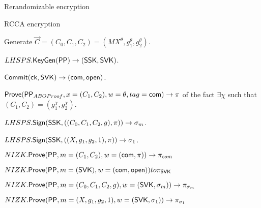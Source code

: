 \begin{frame}{Rerandomizable encryption}



      \tiny
      RCCA encryption 
      \begin{itemize}
      \item Generate $\vec{C} = (C_0, C_1, C_2) = (MX^{\theta}, g_1^{\theta},  g_2^{\theta})$.
      \item $LHSPS.{\mathsf{KeyGen}}(\mathsf{PP}) \to (\mathsf{SSK}, \mathsf{SVK})$.
      \item ${\mathsf{Commit}}(\mathsf{ck}, \mathsf{SVK}) \to (\mathsf{com}, \mathsf{open})$.
      \item ${\mathsf{Prove}}(\mathsf{PP}_{ABOProof}, x = (C_1, C_2), w = \theta, tag = \mathsf{com}) \to \pi$ of the fact $\exists \chi$ such that $(C_1, C_2) = (g_1^\chi, g_2^\chi)$.
      \item {\color{red}$LHSPS.{\mathsf{Sign}}(\mathsf{SSK},((C_0,C_1,C_2, g),\pi)) \to \sigma_m$.}
      \item {\color{red}$LHSPS.{\mathsf{Sign}}(\mathsf{SSK},((X,g_1,g_2, 1),\pi)) \to \sigma_1$.}
        {\color{blue}
        \item $NIZK.{\mathsf{Prove}}(\mathsf{PP}, m = (C_1, C_2), w = (\mathsf{com},\pi)) \to \pi_{com}$
        \item $NIZK.{\mathsf{Prove}}(\mathsf{PP}, m = (\mathsf{SVK}), w = (\mathsf{com}, \mathsf{open})) to \pi_{\mathsf{SVK}}$
        \item $NIZK.{\mathsf{Prove}}(\mathsf{PP}, m = (C_0,C_1,C_2,g), w = (\mathsf{SVK}, \sigma_m)) \to \pi_{\sigma_m}$
        \item $NIZK.{\mathsf{Prove}}(\mathsf{PP}, m = (X,g_1,g_2,1), w = (\mathsf{SVK}, \sigma_1)) \to \pi_{\sigma_1}$
        }
        

\end{itemize}
\end{frame}
